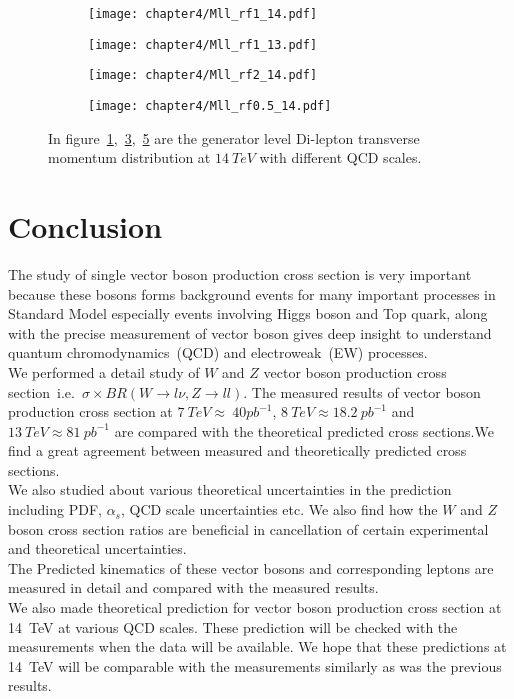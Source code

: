 \documentclass[a4paper,12pt]{report}
\numberwithin{equation}{section}
\begin{document}
\begin{figure}[H]
\centering
\begin{subfigure}{0.49\textwidth}
\texttt{[image: chapter4/Mll\_rf1\_14.pdf]}
\vspace*{-8mm}
\caption{}
\label{mll14}
\end{subfigure}
\begin{subfigure}{0.49\textwidth}
\texttt{[image: chapter4/Mll\_rf1\_13.pdf]}
\vspace*{-8mm}
\caption{}
\label{mll13}
\end{subfigure}
\begin{subfigure}{0.49\textwidth}
\texttt{[image: chapter4/Mll\_rf2\_14.pdf]}
\vspace*{-8mm}
\caption{}
\label{mll142}
\end{subfigure}
\begin{subfigure}{0.49\textwidth}
\texttt{[image: chapter4/Mll\_rf0.5\_14.pdf]}
\vspace*{-8mm}
\caption{}
\label{mll140}
\end{subfigure}

\caption{In figure~\ref{mll14},~\ref{mll142},~\ref{mll140} are the generator level Di-lepton transverse momentum distribution at $14~TeV$ with different QCD scales.}  
\end{figure}


\chapter*{Conclusion}
The study of single vector boson production cross section is very important because these bosons forms background events for many important processes in Standard Model especially events involving Higgs boson and Top quark, along with the precise measurement of vector boson gives deep insight to understand quantum chromodynamics~(QCD) and electroweak~(EW) processes.\\
We performed a detail study of $W$ and $Z$ vector boson production cross section~i.e.~$\sigma\times BR(W\rightarrow l\nu, Z\rightarrow ll)$. The measured results of vector boson production cross section at $7~TeV\approx~ 40pb^{-1}$, $8~TeV\approx 18.2~pb^{-1}$ and $13~TeV\approx 81~pb^{-1}$ are compared with the theoretical predicted cross sections.We find a great agreement between measured and theoretically predicted cross sections.\\
We also studied about various theoretical uncertainties in the prediction including PDF, $\alpha_{s}$, QCD scale uncertainties etc. We also find how the $W$ and $Z$ boson cross section ratios are beneficial in cancellation of certain experimental and theoretical uncertainties.\\
The Predicted kinematics of these vector bosons and corresponding leptons are measured in detail and compared with the measured results.\\
We also made theoretical prediction for vector boson production cross section at 14~TeV at various QCD scales. These prediction will be checked with the measurements when the data will be available. We hope that these predictions at 14~TeV will be comparable with the measurements similarly as was the previous results.
\end{document}
